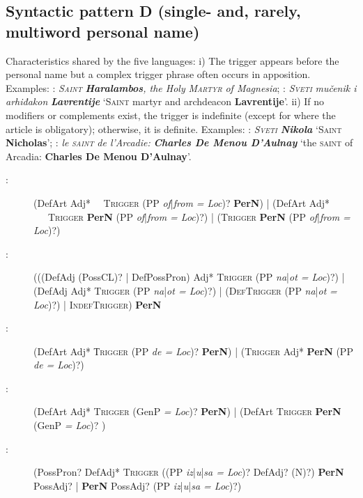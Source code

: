 \documentclass[output=paper]{langsci/langscibook}
\newcommand{\trigger}[1]{\textsc{#1}}
\begin{document}
\subsection{Syntactic pattern D (single- and, rarely, multiword personal name)}

Characteristics shared by the five languages: i) The trigger appears
before the personal name but a complex trigger phrase often occurs in
apposition. Examples: : \textit{\trigger{Saint}}
\textbf{\textit{Haralambos}}\textit{, the Holy }\textit{\trigger{Martyr}}
\textit{of Magnesia}; : \textit{\trigger{Sveti}} \textit{mučenik i
arhiđakon} \textbf{\textit{Lavrentije}} ‘\trigger{Saint} martyr and
archdeacon \textbf{Lavrentije}’. ii) If no modifiers or complements
exist, the trigger is indefinite (except for  where the article is
obligatory); otherwise, it is definite. Examples: :
\textit{\trigger{Sveti}}
\textbf{\textit{Nikola}}
‘\trigger{Saint}
\textbf{Nicholas}’; :
\textit{le}
\textit{\trigger{saint}}
\textit{de l'Arcadie:}
\textbf{\textit{Charles De Menou D'Aulnay}}
‘the \trigger{saint} of  Arcadia:
\textbf{Charles De Menou D'Aulnay}’.


\begin{description}

\item[:] (DefArt Adj* ~~\trigger{Trigger} (PP \textit{of}|\textit{from = Loc})?
\textbf{PerN}) | (DefArt Adj* ~~~\trigger{Trigger} \textbf{PerN} (PP
\textit{of}|\textit{from = Loc})?) | (\trigger{Trigger} \textbf{PerN }(PP
\textit{of}|\textit{from = Loc})?)

 

\item[:] (((DefAdj (PossCL)? | DefPossPron) Adj* \trigger{Trigger} (PP
\textit{na}|\textit{ot = Loc})?) | (DefAdj Adj* \trigger{Trigger} (PP
\textit{na}|\textit{ot = Loc})?) | (\trigger{DefTrigger} (PP \textit{na}|\textit{ot} \textit{ =
Loc})?) | \trigger{IndefTrigger}) \textbf{PerN}

 

\item[:] (DefArt Adj* \trigger{Тrigger} (PP \textit{de = Loc})? \textbf{PerN})
| (\trigger{Trigger} Adj* \textbf{PerN }(PP \textit{de = Loc})?)

 

\item[:] (DefArt Adj* \trigger{Trigger} (GenP \textit{= Loc})? \textbf{PerN}) |
(DefArt \trigger{Trigger} \textbf{PerN }(GenP \textit{= Loc})? )

 

\item[:] (PossPron? DefAdj* \trigger{Trigger} ((PP \textit{iz}|\textit{u}|\textit{sa =
Loc})? DefAdj? (N)?) \textbf{PerN }PossAdj? | \textbf{PerN }PossAdj?
(PP \textit{iz}|\textit{u}|\textit{sa = Loc})?)
\end{description}
\end{document}
